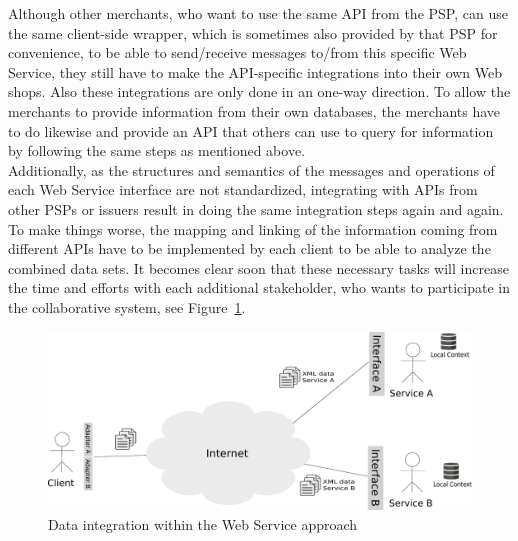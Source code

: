 Although other merchants, who want to use the same \gls{API} from the \gls{PSP}, can use the same client-side wrapper, which is sometimes also provided by that \gls{PSP} for convenience, to be able to send/receive messages to/from this specific Web Service, they still have to make the \gls{API}-specific integrations into their own Web shops. Also these integrations are only done in an one-way direction. To allow the merchants to provide information from their own databases, the merchants have to do likewise and provide an \gls{API} that others can use to query for information by following the same steps as mentioned above. \\

Additionally, as the structures and semantics of the messages and operations of each Web Service interface are not standardized, integrating with \gls{API}s from other \gls{PSP}s or issuers result in doing the same integration steps again and again. To make things worse, the mapping and linking of the information coming from different \gls{API}s have to be implemented by each client to be able to analyze the combined data sets. It becomes clear soon that these necessary tasks will increase the time and efforts with each additional stakeholder, who wants to participate in the collaborative system, see Figure~\ref{fig:web_services_scenario}. \\

\begin{figure}[!ht]
  \centering
  \includegraphics[width=0.9\columnwidth]{images/web-services-scenario.pdf}
  \caption{Data integration within the Web Service approach}
\label{fig:web_services_scenario}
\end{figure}

